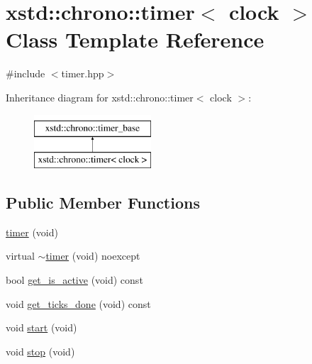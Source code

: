 \hypertarget{classxstd_1_1chrono_1_1timer}{\section{xstd\-:\-:chrono\-:\-:timer$<$ clock $>$ Class Template Reference}
\label{classxstd_1_1chrono_1_1timer}
}


{\ttfamily \#include $<$timer.\-hpp$>$}

Inheritance diagram for xstd\-:\-:chrono\-:\-:timer$<$ clock $>$\-:\begin{figure}[H]
\begin{center}
\leavevmode
\includegraphics[height=2.000000cm]{classxstd_1_1chrono_1_1timer}
\end{center}
\end{figure}
\subsection*{Public Member Functions}
\begin{DoxyCompactItemize}
\item 
\hyperlink{classxstd_1_1chrono_1_1timer_a1d151d2452b9a4b5d00b37b238b86a9c}{timer} (void)
\item 
virtual \hyperlink{classxstd_1_1chrono_1_1timer_a274db25436fb2392246f64395ac4f2dc}{$\sim$timer} (void) noexcept
\item 
bool \hyperlink{classxstd_1_1chrono_1_1timer_a1496749b90d70cee8c29c66f9c67e21a}{get\-\_\-is\-\_\-active} (void) const 
\item 
void \hyperlink{classxstd_1_1chrono_1_1timer_a6ad3088df2f2ca33ea7246f1c716b65a}{get\-\_\-ticks\-\_\-done} (void) const 
\item 
void \hyperlink{classxstd_1_1chrono_1_1timer_a66a27994093e3a8cd5be70e82e577e25}{start} (void)
\item 
void \hyperlink{classxstd_1_1chrono_1_1timer_acb361a9fbbafe351513ee6251feb1000}{stop} (void)
\end{DoxyCompactItemize}
